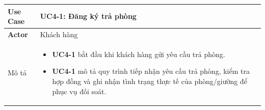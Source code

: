 \begin{table}[H]
    \centering
    \vspace{0.2cm}
\begin{tabularx}{\textwidth}{|>{\centering\arraybackslash\bfseries}m{3.5cm}|X|}
    \hline
    Use Case & {\centering\textbf{UC4-1: Đăng ký trả phòng}\par} \\ 
    \hline
     
    Actor & Khách hàng \\
    \hline

    Mô tả & 
    \vspace{0.2cm}
    \begin{itemize}[leftmargin=*, nosep, label=-]
        \item \textbf{UC4-1} bắt đầu khi khách hàng gửi yêu cầu trả phòng.
        \item \textbf{UC4-1} mô tả quy trình tiếp nhận yêu cầu trả phòng, kiểm tra hợp đồng và ghi nhận tình trạng thực tế của phòng/giường để phục vụ đối soát.
    \end{itemize} \\ 
    \hline
     

\end{tabularx}
\end{table}
